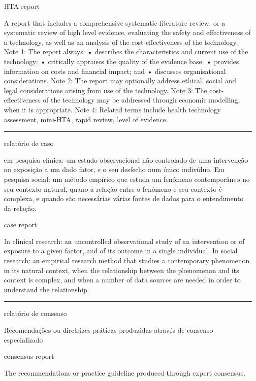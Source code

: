\documentclass[
]{book}
\begin{document}
HTA report

A report that includes a comprehensive systematic literature review, or a systematic review of high level evidence, evaluating the safety and effectiveness of a technology, as well as an analysis of the cost-effectiveness of the technology. Note 1: The report always: • describes the characteristics and current use of the technology; • critically appraises the quality of the evidence base; • provides information on costs and financial impact; and • discusses organisational considerations. Note 2: The report may optionally address ethical, social and legal considerations arising from use of the technology. Note 3: The cost-effectiveness of the technology may be addressed through economic modelling, when it is appropriate. Note 4: Related terms include health technology assessment, mini-HTA, rapid review, level of evidence.

\begin{center}\rule{0.5\linewidth}{0.5pt}\end{center}

relatório de caso

em pesquisa clínica: um estudo observacional não controlado de uma intervenção ou exposição a um dado fator, e o seu desfecho num único indivíduo. Em pesquisa social: um método empírico que estuda um fenômeno contemporâneo no seu contexto natural, quano a relação entre o fenômeno e seu contexto é complexa, e quando são necessárias várias fontes de dados para o entendimento da relação.

case report

In clinical research: an uncontrolled observational study of an intervention or of exposure to a given factor, and of its outcome in a single individual. In social research: an empirical research method that studies a contemporary phenomenon in its natural context, when the relationship between the phenomenon and its context is complex, and when a number of data sources are needed in order to understand the relationship.

\begin{center}\rule{0.5\linewidth}{0.5pt}\end{center}

relatório de consenso

Recomendações ou diretrizes práticas produzidas através de consenso especializado

consensus report

The recommendations or practice guideline produced through expert consensus.
\end{document}
